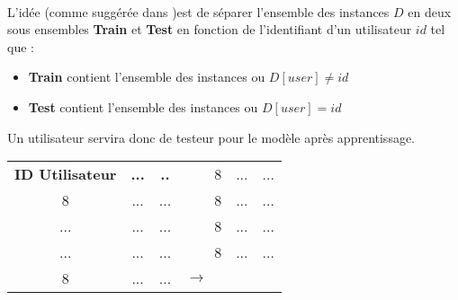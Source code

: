 \paragraph{}L'idée (comme suggérée dans \cite{datasetDetails} )est de séparer l'ensemble des instances $D$ en deux sous ensembles \textbf{Train} et \textbf{Test} en fonction de l'identifiant d'un utilisateur $id$ tel que : 
\begin{itemize}
	\item \textbf{Train} contient l'ensemble des instances ou $D[user]\ne id$
	\item \textbf{Test} contient l'ensemble des instances ou $D[user] = id$
\end{itemize}
\par 
Un utilisateur servira donc de testeur pour le modèle après apprentissage.
\begin{table}[H]
	\centering
	\begin{tabular}{|c|c|c|lllll}
		\cline{1-3} \cline{6-8}
		\textbf{ID Utilisateur}   & \textbf{...}                & \textbf{..}                 &                    & \multicolumn{1}{c|}{} & \multicolumn{1}{c|}{\cellcolor[HTML]{9AFF99}8} & \multicolumn{1}{c|}{\cellcolor[HTML]{9AFF99}...} & \multicolumn{1}{c|}{...} \\ \cline{1-3} \cline{6-8} 
		\cellcolor[HTML]{9AFF99}8 & \cellcolor[HTML]{9AFF99}... & \cellcolor[HTML]{9AFF99}... &                    & \multicolumn{1}{c|}{} & \multicolumn{1}{c|}{\cellcolor[HTML]{9AFF99}8} & \multicolumn{1}{c|}{\cellcolor[HTML]{9AFF99}...} & \multicolumn{1}{c|}{...} \\ \cline{1-3} \cline{6-8} 
		...                       & ...                         & ...                         &                    & \multicolumn{1}{c|}{} & \multicolumn{1}{c|}{\cellcolor[HTML]{9AFF99}8} & \multicolumn{1}{c|}{\cellcolor[HTML]{9AFF99}...} & \multicolumn{1}{c|}{...} \\ \cline{1-3} \cline{6-8} 
		...                       & ...                         & ...                         & \multirow{-4}{*}{} & \multicolumn{1}{c|}{} & \multicolumn{1}{c|}{\cellcolor[HTML]{9AFF99}8} & \multicolumn{1}{c|}{\cellcolor[HTML]{9AFF99}...} & \multicolumn{1}{c|}{...} \\ \cline{1-3} \cline{6-8} 
		\cellcolor[HTML]{9AFF99}8 & \cellcolor[HTML]{9AFF99}... & \cellcolor[HTML]{9AFF99}... & \multicolumn{4}{l}{$\rightarrow$}                                                                                                              &                          \\ \cline{1-3} \cline{6-8} 

\end{tabular}
\end{table}
